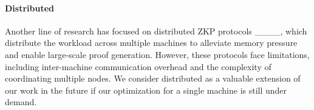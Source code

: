 \paragraph{Distributed \zk}  
Another line of research has focused on distributed ZKP protocols ____, which distribute the workload across multiple machines to alleviate memory pressure and enable large-scale proof generation. However, these protocols face limitations, including inter-machine communication overhead and the complexity of coordinating multiple nodes. 
We consider distributed \zk as a valuable extension of our work in the future if our optimization for a single machine is still under demand. 


